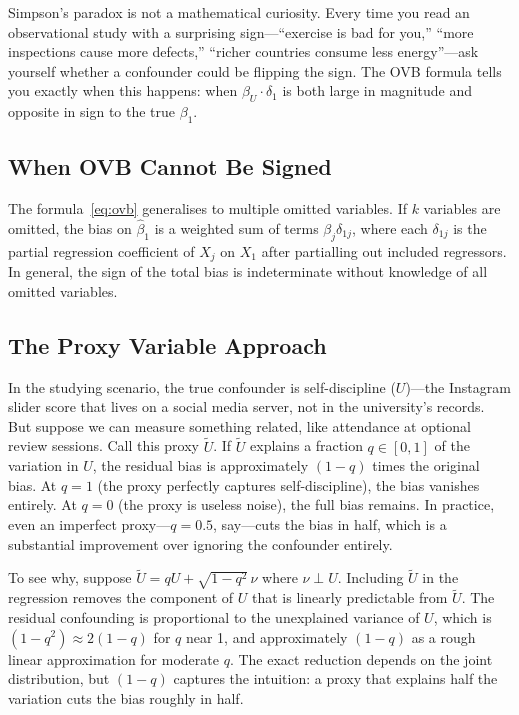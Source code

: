 \documentclass[11pt,a4paper]{article}
\theoremstyle{definition}
\theoremstyle{plain}
\theoremstyle{remark}
\newcommand{\bhat}{\hat{\beta}}
\begin{document}
\begin{keyinsight}
Simpson's paradox is not a mathematical curiosity. Every time you read an observational study with a surprising sign---``exercise is bad for you,'' ``more inspections cause more defects,'' ``richer countries consume less energy''---ask yourself whether a confounder could be flipping the sign. The OVB formula tells you exactly when this happens: when $\beta_U \cdot \delta_1$ is both large in magnitude and opposite in sign to the true $\beta_1$.
\end{keyinsight}

\subsection{When OVB Cannot Be Signed}

The formula~\eqref{eq:ovb} generalises to multiple omitted variables.
If $k$ variables are omitted, the bias on $\bhat_1$ is a weighted sum of terms $\beta_j \delta_{1j}$, where each $\delta_{1j}$ is the partial regression coefficient of $X_j$ on $X_1$ after partialling out included regressors.
In general, the sign of the total bias is indeterminate without knowledge of all omitted variables.

\subsection{The Proxy Variable Approach}

\begin{repairbox}
In the studying scenario, the true confounder is self-discipline ($U$)---the Instagram slider score that lives on a social media server, not in the university's records. But suppose we can measure something related, like attendance at optional review sessions. Call this proxy $\tilde{U}$. If $\tilde{U}$ explains a fraction $q \in [0,1]$ of the variation in $U$, the residual bias is approximately $(1-q)$ times the original bias.
At $q = 1$ (the proxy perfectly captures self-discipline), the bias vanishes entirely. At $q = 0$ (the proxy is useless noise), the full bias remains. In practice, even an imperfect proxy---$q = 0.5$, say---cuts the bias in half, which is a substantial improvement over ignoring the confounder entirely.

To see why, suppose $\tilde{U} = qU + \sqrt{1-q^2}\,\nu$ where $\nu \perp U$. Including $\tilde{U}$ in the regression removes the component of $U$ that is linearly predictable from $\tilde{U}$. The residual confounding is proportional to the unexplained variance of $U$, which is $(1-q^2) \approx 2(1-q)$ for $q$ near 1, and approximately $(1-q)$ as a rough linear approximation for moderate $q$. The exact reduction depends on the joint distribution, but $(1-q)$ captures the intuition: a proxy that explains half the variation cuts the bias roughly in half.
\end{repairbox}
\end{document}
